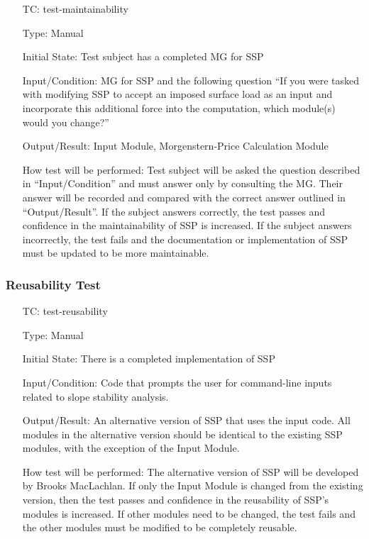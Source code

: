 \documentclass[12pt, titlepage]{article}
\newcounter{testnum} %
\newcommand{\progname}{SSP}
\begin{document}
\begin{enumerate}[label=TC\arabic*:,ref={\arabic*}]
	
\item [TC\refstepcounter{testnum}\thetestnum: \label{TC_Maintainability}] 
test-maintainability

Type: Manual
					
Initial State: Test subject has a completed MG for \progname{}
					
Input/Condition: MG for \progname{} and the following question ``If you were 
tasked with modifying \progname{} to accept an imposed surface load as an input 
and incorporate this additional force into the computation, which module(s) 
would you change?''
					
Output/Result: Input Module, Morgenstern-Price Calculation Module
					
How test will be performed: Test subject will be asked the question described 
in ``Input/Condition'' and must answer only by consulting the MG. Their answer 
will be recorded and compared with the correct answer outlined in 
``Output/Result''. If the subject answers correctly, the test passes and 
confidence in the maintainability of \progname{} is increased. If the subject 
answers incorrectly, the test fails and the documentation or implementation of 
\progname{} must be updated to be more maintainable.
					
\end{enumerate}


\subsubsection{Reusability Test} \label{sec_Reusability}

\begin{enumerate}[label=TC\arabic*:,ref={\arabic*}]
	
\item [TC\refstepcounter{testnum}\thetestnum: \label{TC_Reusability}] 
test-reusability

Type: Manual

Initial State: There is a completed implementation of \progname{}
	
Input/Condition: Code that prompts the user for command-line inputs related to 
slope stability analysis.

Output/Result: An alternative version of \progname{} that uses the input code. 
All modules in the alternative version should be identical to the existing 
\progname{} modules, with the exception of the Input Module.

How test will be performed: The alternative version of \progname{} will be 
developed by Brooks MacLachlan. If only the Input Module is changed from the 
existing version, then the test passes and confidence in the reusability of 
\progname{}'s modules is increased. If other modules need to be changed, the 
test fails and the other modules must be modified to be completely reusable.
	
\end{enumerate}
\end{document}
